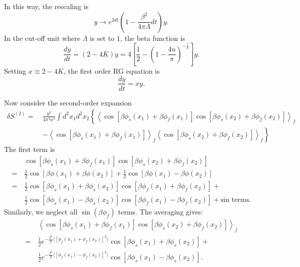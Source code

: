 In this way, the rescaling is
\begin{equation}
	y \rightarrow e^{2dt}\left(1-\frac{\beta^2}{4\pi\Lambda}dt\right) y.
\end{equation}
In the cut-off unit where $\Lambda$ is set to $1$, the beta function is
\begin{equation}
	\frac{dy}{dt} = (2-4K) y = 4\left[\frac{1}{2}-\left(1-\frac{4u}{\pi}\right)^{-\frac{1}{2}}\right]y.
\end{equation}
Setting $x\equiv 2-4K$, the first order RG equation is
\begin{equation}
	\frac{dy}{dt} = xy.
\end{equation}

Now consider the second-order expansion
\begin{equation}
\begin{aligned}
	\delta S^{(2)} 
	=&\ \frac{y^2}{4\pi^4 a^4} \int d^2 x_1 d^2 x_2 \left\{ \left\langle \cos\left[\beta\phi_s(x_1)+\beta\phi_f(x_1)\right] \cos\left[\beta\phi_s(x_2)+\beta\phi_f(x_2)\right] \right\rangle_f \right. \\
	&\ \left. -\left\langle \cos\left[\beta\phi_s(x_1)+\beta\phi_f(x_1)\right]\right\rangle_f \left\langle \cos\left[\beta\phi_s(x_2)+\beta\phi_f(x_2)\right]\right\rangle_f \right\}
\end{aligned}
\end{equation}
The first term is 
\begin{equation}
\begin{aligned}
	&\  \cos\left[\beta\phi_s(x_1)+\beta\phi_f(x_1)\right] 
		\cos\left[\beta\phi_s(x_2)+\beta\phi_f(x_2)\right] \\
	=&\ \frac{1}{2}\cos\left[\beta\phi(x_1)+\beta\phi(x_2)\right] + 
	  \frac{1}{2}\cos\left[\beta\phi(x_1)-\beta\phi(x_2)\right] \\
	=&\ \frac{1}{2}\cos\left[\beta\phi_s(x_1)+\beta\phi_s(x_2)\right] \cos\left[\beta\phi_f(x_1)+\beta\phi_f(x_2)\right] + \\
	&\ \frac{1}{2}\cos\left[\beta\phi_s(x_1)-\beta\phi_s(x_2)\right] \cos\left[\beta\phi_f(x_1)-\beta\phi_f(x_2)\right] + \text{sin terms}.
\end{aligned}
\end{equation}
Similarly, we neglect all $\sin(\beta\phi_f)$ terms.
The averaging gives:
\begin{equation}
\begin{aligned}
	&\  \left\langle\cos\left[\beta\phi_s(x_1)+\beta\phi_f(x_1)\right] 
		\cos\left[\beta\phi_s(x_2)+\beta\phi_f(x_2)\right]\right\rangle_f \\
	=&\ \frac{1}{2} e^{-\frac{\beta^2}{2}\langle[\phi_f(x_1)+\phi_f(x_2)]^2\rangle} \cos[\beta\phi_s(x_1)+\beta\phi_s(x_2)] + \\
	&\  \frac{1}{2} e^{-\frac{\beta^2}{2}\langle[\phi_f(x_1)-\phi_f(x_2)]^2\rangle} \cos[\beta\phi_s(x_1)-\beta\phi_s(x_2)].
\end{aligned}
\end{equation}
